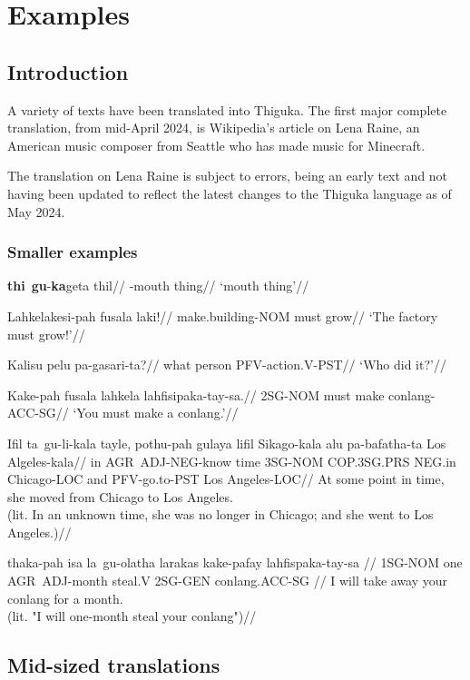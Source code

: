 
\part{Examples}
\chapter{Introduction}
A variety of texts have been translated into Thiguka. The first major complete translation, from mid-April 2024, is Wikipedia's article on Lena Raine, an American music composer from Seattle who has made music for Minecraft.

The translation on Lena Raine is subject to errors, being an early text and not having been updated to reflect the latest changes to the Thiguka language as of May 2024.

\section{Smaller examples}
\ex
\begingl
    \gla \textbf{thi}~\textbf{gu}-\textbf{ka}geta thil//
    \glb \agradj{}-mouth thing//
    \glft `mouth thing'//
\endgl
\xe

\ex
\begingl
    \gla Lahkelakesi-pah fusala laki!//
    \glb make.building-NOM must grow//
    \glft `The factory must grow!'//
\endgl
\xe

\ex
\begingl
    \gla Kalisu pelu pa-gasari-ta?//
    \glb what person PFV-action.V-PST//
    \glft `Who did it?'//
\endgl
\xe

\ex
\begingl
    \gla Kake-pah fusala lahkela lahfisipaka-tay-sa.//
    \glb 2SG-NOM must make conlang-ACC-SG//
    \glft `You must make a conlang.'//
\endgl
\xe

\ex
\begingl
    \gla Ifil ta~gu-li-kala    tayle, pothu-pah gulaya      lifil  Sikago-kala alu pa-bafatha-ta Los Algeles-kala//
    \glb in   AGR~ADJ-NEG-know time   3SG-NOM   COP.3SG.PRS NEG.in Chicago-LOC and PFV-go.to-PST Los Angeles-LOC//
    \glft At some point in time, she moved from Chicago to Los Angeles.\\
          (lit. In an unknown time, she was no longer in Chicago; and she went to Los Angeles.)//
\endgl
\xe

\ex
\begingl
    \gla  thaka-pah isa la~gu-olatha  larakas kake-pafay lahfispaka-tay-sa //
    \glb  1SG-NOM   one AGR~ADJ-month steal.V 2SG-GEN    conlang.ACC-SG //
    \glft I will take away your conlang for a month.\\
          (lit. "I will one-month steal your conlang")//
\endgl
\xe




\chapter{Mid-sized translations}

\newpage

\newpage


\newpage
